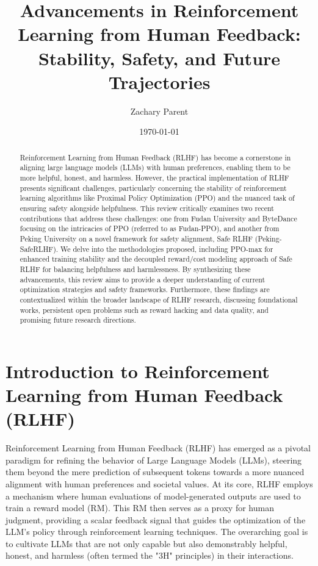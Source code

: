 \documentclass{article} %
\title{Advancements in Reinforcement Learning from Human Feedback: Stability, Safety, and Future Trajectories}
\author{Zachary Parent}
\date{\today}
\begin{document}
\maketitle

\begin{abstract}
Reinforcement Learning from Human Feedback (RLHF) has become a cornerstone in aligning large language models (LLMs) with human preferences, enabling them to be more helpful, honest, and harmless. However, the practical implementation of RLHF presents significant challenges, particularly concerning the stability of reinforcement learning algorithms like Proximal Policy Optimization (PPO) and the nuanced task of ensuring safety alongside helpfulness. This review critically examines two recent contributions that address these challenges: one from Fudan University and ByteDance focusing on the intricacies of PPO (referred to as Fudan-PPO), and another from Peking University on a novel framework for safety alignment, Safe RLHF (Peking-SafeRLHF). We delve into the methodologies proposed, including PPO-max for enhanced training stability and the decoupled reward/cost modeling approach of Safe RLHF for balancing helpfulness and harmlessness. By synthesizing these advancements, this review aims to provide a deeper understanding of current optimization strategies and safety frameworks. Furthermore, these findings are contextualized within the broader landscape of RLHF research, discussing foundational works, persistent open problems such as reward hacking and data quality, and promising future research directions.
\end{abstract}

\section{Introduction to Reinforcement Learning from Human Feedback (RLHF)}
\label{sec:introduction}

Reinforcement Learning from Human Feedback (RLHF) has emerged as a pivotal paradigm for refining the behavior of Large Language Models (LLMs), steering them beyond the mere prediction of subsequent tokens towards a more nuanced alignment with human preferences and societal values. \cite{Ouyang2022InstructGPT} At its core, RLHF employs a mechanism where human evaluations of model-generated outputs are used to train a reward model (RM). This RM then serves as a proxy for human judgment, providing a scalar feedback signal that guides the optimization of the LLM's policy through reinforcement learning techniques. The overarching goal is to cultivate LLMs that are not only capable but also demonstrably helpful, honest, and harmless (often termed the "3H" principles) in their interactions. \cite{Ouyang2022InstructGPT}
\end{document}
